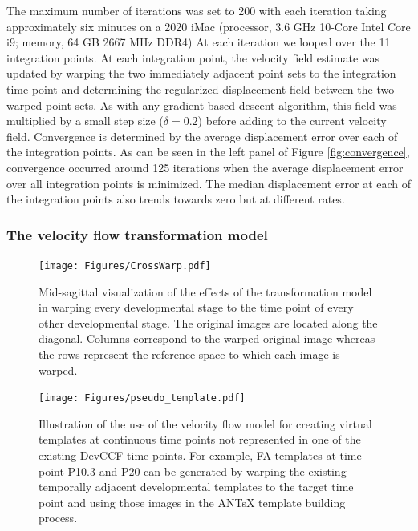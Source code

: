 \documentclass[
  12pt,
]{article}
\begin{document}
The maximum number of iterations was set to 200 with each iteration
taking approximately six minutes on a 2020 iMac (processor, 3.6 GHz
10-Core Intel Core i9; memory, 64 GB 2667 MHz DDR4) At each iteration we
looped over the 11 integration points. At each integration point, the
velocity field estimate was updated by warping the two immediately
adjacent point sets to the integration time point and determining the
regularized displacement field between the two warped point sets. As
with any gradient-based descent algorithm, this field was multiplied by
a small step size (\(\delta = 0.2\)) before adding to the current
velocity field. Convergence is determined by the average displacement
error over each of the integration points. As can be seen in the left
panel of Figure \ref{fig:convergence}, convergence occurred around 125
iterations when the average displacement error over all integration
points is minimized. The median displacement error at each of the
integration points also trends towards zero but at different rates.

\subsubsection{The velocity flow transformation
model}\label{the-velocity-flow-transformation-model}

\begin{figure}[!htb]
\centering
\texttt{[image: Figures/CrossWarp.pdf]}
\caption{Mid-sagittal visualization of the effects of the transformation model in
warping every developmental stage to the time point of every other developmental
stage.  The original images are located along the diagonal.  Columns correspond
to the warped original image whereas the rows represent the reference space to which
each image is warped.}
\label{fig:crosswarp}
\end{figure}

\begin{figure}[!htb]
\centering
\texttt{[image: Figures/pseudo\_template.pdf]}
\caption{Illustration of the use of the velocity flow model for creating virtual templates
at continuous time points not represented in one of the existing DevCCF time points.
For example, FA templates at time point P10.3 and P20 can be generated by warping the 
existing temporally adjacent developmental templates to the target time point and using 
those images in the ANTsX template building process.}
\label{fig:virtual}
\end{figure}
\end{document}
